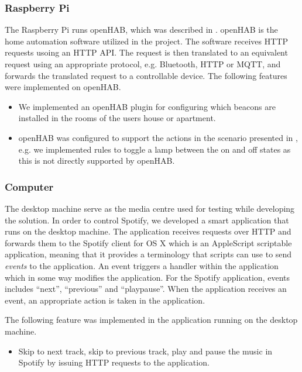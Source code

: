 \subsubsection{Raspberry Pi}

The Raspberry Pi runs openHAB, which was described in . openHAB is the home automation software utilized in the project. The software receives HTTP requests usoing an HTTP API. The request is then translated to an equivalent request using an appropriate protocol, e.g. Bluetooth, HTTP or MQTT, and forwards the translated request to a controllable device. The following features were implemented on openHAB.

\begin{itemize}
\item We implemented an openHAB plugin for configuring which beacons are installed in the rooms of the users house or apartment.
\item openHAB was configured to support the actions in the scenario presented in , e.g. we implemented rules to toggle a lamp between the on and off states as this is not directly supported by openHAB.
\end{itemize}

\subsubsection{Computer}

The desktop machine serve as the media centre used for testing while developing the solution. In order to control Spotify, we developed a smart application that runs on the desktop machine. The application receives requests over HTTP and forwards them to the Spotify client for OS X which is an AppleScript scriptable application, meaning that it provides a terminology that scripts can use to send \emph{events} to the application. An event triggers a handler within the application which in some way modifies the application. For the Spotify application, events includes ``next'', ``previous'' and ``playpause''. When the application receives an event, an appropriate action is taken in the application.

The following feature was implemented in the application running on the desktop machine.

\begin{itemize}
\item Skip to next track, skip to previous track, play and pause the music in Spotify by issuing HTTP requests to the application.
\end{itemize}

